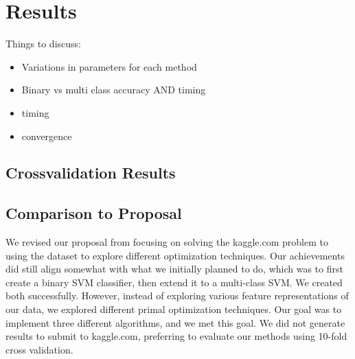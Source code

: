 \documentclass[letterpaper, 11pt]{article}
\begin{document}
\section{Results}
Things to discuss:
\begin{itemize}
	\item Variations in parameters for each method
	\item Binary vs multi class accuracy AND timing
	\item timing
	\item convergence
\end{itemize}

\subsection{Crossvalidation Results}


\subsection{Comparison to Proposal}
We revised our proposal from focusing on solving the kaggle.com problem to using the dataset to explore different optimization techniques.  Our achievements did still align somewhat with what we initially planned to do, which was to first create a binary SVM classifier, then extend it to a multi-class SVM.  We created both successfully.  However, instead of exploring various feature representations of our data, we explored different primal optimization techniques.  Our goal was to implement three different algorithms, and we met this goal.  We did not generate results to submit to kaggle.com, preferring to evaluate our methods using 10-fold cross validation. 



\nocite{*}
 

\end{document}
